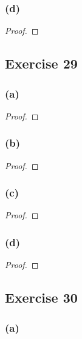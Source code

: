 \documentclass[14pt]{extarticle}
\begin{document}
\subsubsection{(d)}

\begin{proof}

\end{proof}

\subsection{Exercise 29}

\subsubsection{(a)}

\begin{proof}

\end{proof}

\subsubsection{(b)}

\begin{proof}

\end{proof}

\subsubsection{(c)}

\begin{proof}

\end{proof}

\subsubsection{(d)}

\begin{proof}

\end{proof}

\subsection{Exercise 30}

\subsubsection{(a)}
\end{document}

